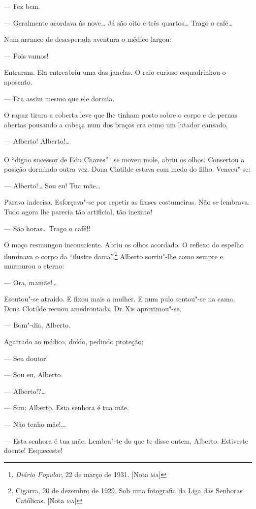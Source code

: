 --- Fez bem.

--- Geralmente acordava às nove\ldots{} Já são oito e três quartos\ldots{} Trago o
café\ldots{}

Num arranco de desesperada aventura o médico largou:

--- Pois vamos!

Entraram. Ela entreabriu uma das janelas. O raio curioso esquadrinhou o
aposento.

--- Era assim mesmo que ele dormia.

O rapaz tirara a coberta leve que lhe tinham posto sobre o corpo e de
pernas abertas pousando a cabeça num dos braços era como um lutador
cansado.

--- Alberto! Alberto!\ldots{}

O ``digno sucessor de Edu Chaves''\footnote{\emph{Diário Popular}, 22 de
  março de 1931. {[}Nota \textsc{ma}{]}} se moveu mole, abriu os olhos. Consertou
a posição dormindo outra vez. Dona Clotilde estava com medo do filho.
Venceu"-se:

--- Alberto!\ldots{} Sou eu! Tua mãe\ldots{}

Parava indecisa. Esforçava"-se por repetir as frases costumeiras. Não se
lembrava. Tudo agora lhe parecia tão artificial, tão inexato!

--- São horas\ldots{} Trago o café!!

O moço resmungou inconsciente. Abriu os olhos acordado. O reflexo do
espelho iluminava o corpo da ``ilustre dama''.\footnote{Cigarra, 20 de
  dezembro de 1929. Sob uma fotografia da Liga das Senhoras Católicas.
  {[}Nota \textsc{ma}{]}} Alberto sorriu"-lhe como sempre e murmurou o eterno:

--- Ora, mamãe!\ldots{}

Escutou"-se atraído. E fixou mais a mulher. E num pulo sentou"-se na cama.
Dona Clotilde recuou amedrontada. Dr.\,Xis aproximou"-se.

--- Bom"-dia, Alberto.

Agarrado ao médico, doído, pedindo proteção:

--- Seu doutor!

--- Sou eu, Alberto.

--- Alberto!?\ldots{}

--- Sim: Alberto. Esta senhora é tua mãe.

--- Não tenho mãe!\ldots{}

--- Esta senhora é tua mãe. Lembra"-te do que te disse ontem, Alberto.
Estiveste doente! Esqueceste!

